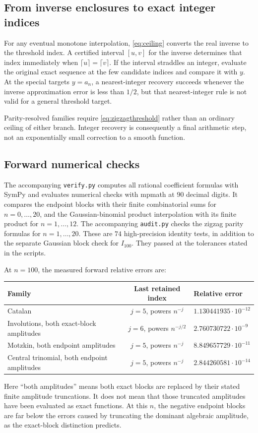 \documentclass[11pt,a4paper]{article}
\theoremstyle{definition}
\theoremstyle{remark}
\numberwithin{equation}{section}
\begin{document}
\subsection{From inverse enclosures to exact integer indices}
For any eventual monotone interpolation, \eqref{eq:ceiling} converts the real inverse to the threshold index. A certified interval $[u,v]$ for the inverse determines that index immediately when $\lceil u\rceil=\lceil v\rceil$. If the interval straddles an integer, evaluate the original exact sequence at the few candidate indices and compare it with $y$. At the special targets $y=a_n$, a nearest-integer recovery succeeds whenever the inverse approximation error is less than $1/2$, but that nearest-integer rule is not valid for a general threshold target.

Parity-resolved families require \eqref{eq:zigzagthreshold} rather than an ordinary ceiling of either branch. Integer recovery is consequently a final arithmetic step, not an exponentially small correction to a smooth function.

\subsection{Forward numerical checks}
The accompanying \texttt{verify.py} computes all rational coefficient formulas with SymPy and evaluates numerical checks with mpmath at $90$ decimal digits. It compares the endpoint blocks with their finite combinatorial sums for $n=0,\ldots,20$, and the Gaussian-binomial product interpolation with its finite product for $n=1,\ldots,12$. The accompanying \texttt{audit.py} checks the zigzag parity formulas for $n=1,\ldots,20$. These are $74$ high-precision identity tests, in addition to the separate Gaussian block check for $I_{100}$. They passed at the tolerances stated in the scripts.

At $n=100$, the measured forward relative errors are:
\begin{center}
\small
\begin{tabularx}{\textwidth}{@{}Xcl@{}}
\toprule
Family & Last retained index & Relative error\\
\midrule
Catalan & $j=5$, powers $n^{-j}$ & $1.130441935\cdot10^{-12}$\\
Involutions, both exact-block amplitudes & $j=6$, powers $n^{-j/2}$ & $2.760730722\cdot10^{-9}$\\
Motzkin, both endpoint amplitudes & $j=5$, powers $n^{-j}$ & $8.849657729\cdot10^{-11}$\\
Central trinomial, both endpoint amplitudes & $j=5$, powers $n^{-j}$ & $2.844260581\cdot10^{-14}$\\
\bottomrule
\end{tabularx}
\end{center}
Here ``both amplitudes'' means both exact blocks are replaced by their stated finite amplitude truncations. It does not mean that those truncated amplitudes have been evaluated as exact functions. At this $n$, the negative endpoint blocks are far below the errors caused by truncating the dominant algebraic amplitude, as the exact-block distinction predicts.
\end{document}

